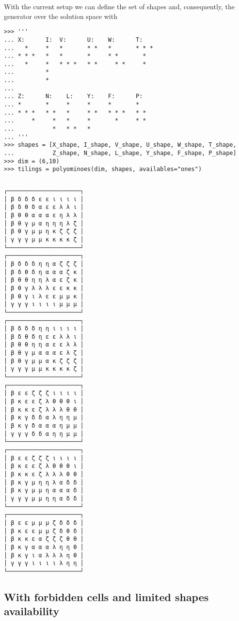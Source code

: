 With the current setup we can define the set of shapes and, consequently, the
generator over the solution space with
\begin{verbatim}
>>> '''
... X:      I:  V:      U:    W:      T:
...   *     *   *       * *   *       * * *
... * * *   *   *       *     * *       *
...   *     *   * * *   * *     * *     *
...         *
...         *
...
... Z:      N:    L:    Y:    F:      P:
... *       *     *     *     *       *
... * * *   * *   *     * *   * * *   * *
...     *     *   *     *       *     * *
...           *   * *   *
... '''
>>> shapes = [X_shape, I_shape, V_shape, U_shape, W_shape, T_shape,
...           Z_shape, N_shape, L_shape, Y_shape, F_shape, P_shape]
>>> dim = (6,10)
>>> tilings = polyominoes(dim, shapes, availables="ones")
\end{verbatim}
\begin{margintable}[-5cm]
\inputminted[fontsize=\footnotesize,]{python}{backtracking/pentominoes-regular-snippet.py}
\begin{Verbatim}[baselinestretch=0.1, fontsize=\footnotesize]
┌─────────────────────┐
│ β δ δ δ ε ε ι ι ι ι │
│ β δ θ δ α ε ε λ λ ι │
│ β θ θ α α α ε η λ λ │
│ β θ γ μ α η η η λ ζ │
│ β θ γ μ μ η κ ζ ζ ζ │
│ γ γ γ μ μ κ κ κ κ ζ │
└─────────────────────┘
┌─────────────────────┐
│ β δ δ δ η η α ζ ζ ζ │
│ β δ θ δ η α α α ζ κ │
│ β θ θ η η λ α ε ζ κ │
│ β θ γ λ λ λ ε ε κ κ │
│ β θ γ ι λ ε ε μ μ κ │
│ γ γ γ ι ι ι ι μ μ μ │
└─────────────────────┘
┌─────────────────────┐
│ β δ δ δ η η ι ι ι ι │
│ β δ θ δ η ε ε λ λ ι │
│ β θ θ η η α ε ε λ λ │
│ β θ γ μ α α α ε λ ζ │
│ β θ γ μ μ α κ ζ ζ ζ │
│ γ γ γ μ μ κ κ κ κ ζ │
└─────────────────────┘
┌─────────────────────┐
│ β ε ε ζ ζ ζ ι ι ι ι │
│ β κ ε ε ζ λ θ θ θ ι │
│ β κ κ ε ζ λ λ λ θ θ │
│ β κ γ δ δ α λ η η μ │
│ β κ γ δ α α α η μ μ │
│ γ γ γ δ δ α η η μ μ │
└─────────────────────┘
┌─────────────────────┐
│ β ε ε ζ ζ ζ ι ι ι ι │
│ β κ ε ε ζ λ θ θ θ ι │
│ β κ κ ε ζ λ λ λ θ θ │
│ β κ γ μ η η λ α δ δ │
│ β κ γ μ μ η α α α δ │
│ γ γ γ μ μ η η α δ δ │
└─────────────────────┘
┌─────────────────────┐
│ β ε ε μ μ μ ζ δ δ δ │
│ β κ ε ε μ μ ζ δ θ δ │
│ β κ κ ε α ζ ζ ζ θ θ │
│ β κ γ α α α λ η η θ │
│ β κ γ ι α λ λ λ η θ │
│ γ γ γ ι ι ι ι λ η η │
└─────────────────────┘
\end{Verbatim}
\end{margintable}

\newpage
\subsection{With forbidden cells and limited shapes availability}


